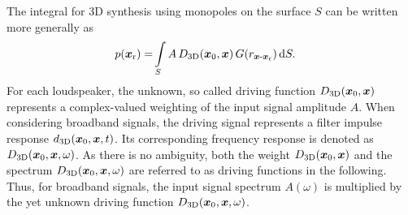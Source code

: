 The integral for 3D synthesis using monopoles on the
surface $S$ can be written more generally as
\begin{align}
p(\bm{x}_\mathrm{r}) =&
\int\limits_S A \, D_\text{3D}(\bm{x}_\mathrm{0},\bm{x}) \, G(r_{\bm{x}\text{-}\bm{x}_\mathrm{r}}) \, \mathrm{d}S.
\label{eq:MonopolIntegral_3D}
\end{align}
For each loudspeaker, the unknown, so called driving function
$D_\text{3D}(\bm{x}_\mathrm{0},\bm{x})$ represents a complex-valued weighting of the input signal
amplitude $A$.
%
When considering broadband signals, the driving signal represents a
filter impulse response $d_\text{3D}(\bm{x}_\mathrm{0},\bm{x}, t)$.
%
Its corresponding frequency response is denoted as $D_\text{3D}(\bm{x}_\mathrm{0},\bm{x},\omega)$.
%
%
As there is no ambiguity, both
the weight $D_\text{3D}(\bm{x}_\mathrm{0},\bm{x})$ and
the spectrum $D_\text{3D}(\bm{x}_\mathrm{0},\bm{x},\omega)$
are referred to as driving functions
in the following.
%
Thus, for broadband signals, the input signal spectrum $A(\omega)$
is multiplied by the yet unknown driving function
$D_\text{3D}(\bm{x}_\mathrm{0},\bm{x},\omega)$.



